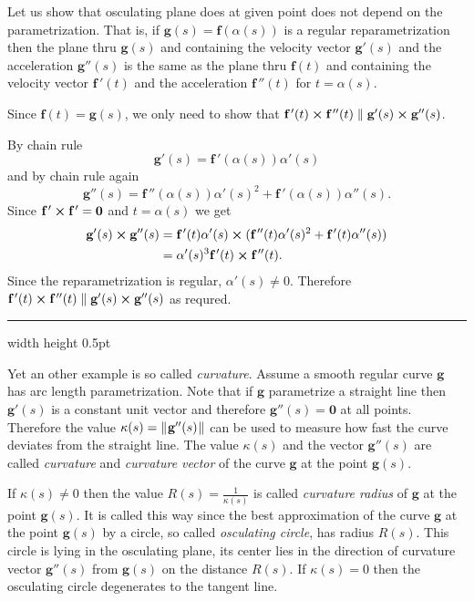 \begin{exmp} Let us show that osculating plane does at given point does not depend on the parametrization.
That is, if $\textbf{g}(s)=\textbf{f}(\alpha(s))$ is a regular reparametrization then 
the plane thru $\textbf{g}(s)$ and containing the velocity vector $\textbf{g}'(s)$ and the acceleration $\textbf{g}''(s)$
is the same as  
the plane thru $\textbf{f}(t)$ and containing the velocity vector $\textbf{f}\,'(t)$ and the acceleration $\textbf{f}\,''(t)$
for $t=\alpha(s)$.

Since $\textbf{f}(t)=\textbf{g}(s)$, 
we only need to show that
$\textbf{f}\,'(t) \bm{\times} \textbf{f}\,''(t)\parallel\textbf{g}'(s) \bm{\times} \textbf{g}''(s)$.

By chain rule
\[\textbf{g}'(s)=\textbf{f}\,'(\alpha(s))\alpha'(s)\] 
and by chain rule again
\[\textbf{g}''(s)=\textbf{f}\,''(\alpha(s))\alpha'(s)^2+\textbf{f}\,'(\alpha(s))\alpha''(s).\] 
Since $\textbf{f}\,' \bm{\times} \textbf{f}\,'=\textbf{0}$ and $t=\alpha(s)$ we get
\begin{align*}
\textbf{g}'(s) \bm{\times} \textbf{g}''(s)
&
=\textbf{f}\,'(t)\alpha'(s) \bm{\times} (\textbf{f}\,''(t)\alpha'(s)^2+\textbf{f}\,'(t)\alpha''(s))
\\
&=
\alpha'(s)^3\textbf{f}\,'(t) \bm{\times} \textbf{f}\,''(t).
\end{align*}
Since the reparametrization is regular, $\alpha'(s)\ne0$.
Therefore $\textbf{f}\,'(t) \bm{\times} \textbf{f}\,''(t)\parallel\textbf{g}'(s) \bm{\times} \textbf{g}''(s)$ as requred.
\end{exmp}
\hrule width \textwidth height 0.5pt
\medskip

Yet an other example is so called \emph{curvature}. 
Assume a smooth regular curve $\textbf{g}$ has arc length parametrization.
Note that if $\textbf{g}$ para\-met\-rize a straight line 
then $\textbf{g}'(s)$ is a constant unit vector and therefore $\textbf{g}''(s)=\textbf{0}$ at all points.
Therefore the value $\kappa(s)=\lVert\mspace{1mu}\textbf{g}''(s)\mspace{1mu}\rVert$ can be used to measure how fast the curve deviates from the straight line.
The value $\kappa(s)$ and the vector $\textbf{g}''(s)$ are called \emph{curvature} and \emph{curvature vector} of the curve $\textbf{g}$ at the point $\textbf{g}(s)$.

If $\kappa(s)\ne 0$ then the value $R(s)=\tfrac1{\kappa(s)}$
is called \emph{curvature radius} of $\textbf{g}$ at the point $\textbf{g}(s)$. 
It is called this way since the best approximation of the curve $\textbf{g}$ at the point $\textbf{g}(s)$ by a circle, so called \emph{osculating circle}, has radius $R(s)$.
This circle is lying in the osculating plane,
its center lies in the direction of curvature vector $\textbf{g}''(s)$ from $\textbf{g}(s)$ on the distance $R(s)$.
If $\kappa(s)=0$ then the osculating circle degenerates to the tangent line.

